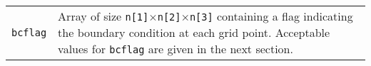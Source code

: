 \documentclass[letterpaper,12pt]{article}
\begin{document}
\begin{tabular}{lp{}}
\verb|bcflag|& Array of size \verb|n[1]|$\times$\verb|n[2]|$\times$\verb|n[3]| containing a flag indicating the boundary condition at each grid point.  Acceptable values for \verb|bcflag| are given in the next section.\\
\end{tabular}
\end{document}
